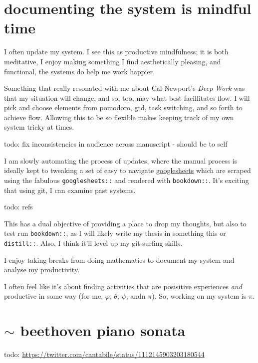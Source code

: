 \documentclass[]{book}
\begin{document}
\hypertarget{mindfulness}{%
\section{documenting the system is mindful time}\label{mindfulness}}

I often update my system. I see this as productive mindfulness; it is both meditative, I enjoy making something I find aesthetically pleasing, and functional, the systems do help me work happier.

Something that really resonated with me about Cal Newport's \emph{Deep Work} was that my situation will change, and so, too, may what best facillitates flow. I will pick and choose elements from pomodoro, gtd, task switching, and so forth to achieve flow. Allowing this to be so flexible makes keeping track of my own system tricky at times.

todo: fix inconsistencies in audience across manuscript - should be to self

I am slowly automating the process of updates, where the manual process is ideally kept to tweaking a set of easy to navigate \href{https://docs.google.com/spreadsheets/d/1hv7pkBGu8XQQOIBbBt1_1LvKGBR7zTdQYCzogrv3hz0/edit?usp=sharing}{googlesheets} which are scraped using the fabulous \texttt{googlesheets::} and rendered with \texttt{bookdown::}. It's exciting that using git, I can examine past systems.

todo: refs

This has a dual objective of providing a place to drop my thoughts, but also to test run \texttt{bookdown::}, as I will likely write my thesis in something this or \texttt{distill::}. Also, I think it'll level up my git-surfing skills.

I enjoy taking breaks from doing mathematics to document my system and analyse my productivity.

I often feel like it's about finding activities that are posisitive experiences \emph{and} productive in some way (for me, \(\varphi\), \(\theta\), \(\psi\), andn \(\pi\)). So, working on my system is \(\pi\).

\hypertarget{sim-beethoven-piano-sonata}{%
\section{\texorpdfstring{\(\sim\) beethoven piano sonata}{\textbackslash{}sim beethoven piano sonata}}\label{sim-beethoven-piano-sonata}}

todo:
\url{https://twitter.com/cantabile/status/1112145903203180544}


\end{document}
